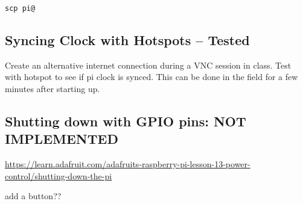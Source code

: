 \documentclass{article}
\begin{document}
\begin{verbatim}
scp pi@
\end{verbatim}
  

\subsection{Syncing Clock with Hotspots -- Tested}

Create an alternative internet connection during a VNC session in class. Test with hotspot to see if pi clock is synced. This can be done in the field for a few minutes after starting up. 

\subsection{Shutting down with GPIO pins: NOT IMPLEMENTED}

\url{https://learn.adafruit.com/adafruits-raspberry-pi-lesson-13-power-control/shutting-down-the-pi}

add a button??
\end{document}
